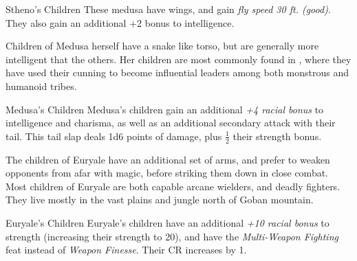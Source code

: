 \begin{35e}{Stheno's Children}
  These medusa have wings, and gain \emph{fly speed 30 ft. (good)}. They also
  gain an additional +2 bonus to intelligence.
\end{35e}

Children of Medusa herself have a snake like torso, but are generally more
intelligent that the others. Her children are most commonly found in
, where they have used their cunning to become
influential leaders among both monstrous and humanoid tribes.

\begin{35e}{Medusa's Children}
  Medusa's children gain an additional \emph{+4 racial bonus} to intelligence
  and charisma, as well as an additional secondary attack with their tail.
  This tail slap deals 1d6 points of damage, plus $ \frac{1}{2} $ their strength
  bonus.
\end{35e}

The children of Euryale have an additional set of arms, and prefer to weaken
opponents from afar with magic, before striking them down in close combat.
Most children of Euryale are both capable arcane wielders, and deadly
fighters. They live mostly in the vast plains and jungle north of Goban
mountain.

\begin{35e}{Euryale's Children}
  Euryale's children have an additional \emph{+10 racial bonus} to strength
  (increasing their strength to 20), and have the \emph{Multi-Weapon Fighting}
  feat instead of \emph{Weapon Finesse}. Their CR increases by 1.
\end{35e}
